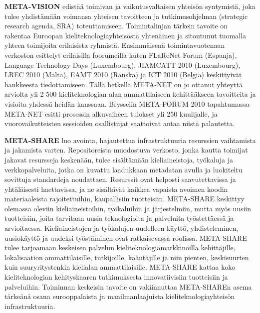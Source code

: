 \begin{multicols}{2}

\textbf{META-VISION} edistää toimivan ja vaikutusvaltaisen yhteisön
syntymistä, joka tulee yhdistämään voimansa yhteisen tavoitteen ja
tutkimusohjelman (strategic research agenda, SRA)
toteuttamiseen. Toimintalinjan tärkein tavoite on rakentaa Euroopan
kieliteknologiayhteisöstä yhtenäinen ja sitoutunut tuomalla yhteen
toimijoita erilaisista ryhmistä. Ensimmäisenä toimintavuotenaan
verkoston esittelyt erilaisilla foorumeilla kuten FLaReNet Forum
(Espanja), Language Technology Days (Luxembourg), JIAMCATT 2010
(Luxembourg), LREC 2010 (Malta), EAMT 2010 (Ranska) ja ICT 2010
(Belgia) keskittyivät hankkeesta tiedottamiseen.  Tällä hetkellä
META-NET on jo ottanut yhteyttä arviolta yli 2 500 kieliteknologian
alan ammattilaiseen kehittääkseen tavoitteita ja visioita yhdessä
heidän kanssaan. Brysselin META-FORUM 2010 tapahtumassa META-NET
esitti prosessin alkuvaiheen tulokset yli 250 kuulijalle, ja
vuorovaikutteisten sessioiden osallistujat saattoivat antaa niistä
palautetta.

\textbf{META-SHARE} luo avointa, hajautettua infrastruktuuria
resurssien vaihtamista ja jakamista varten. Repositoreista muodostuva
verkosto, jonka kautta toimijat jakavat resursseja keskenään, tulee
sisältämään kieliaineistoja, työkaluja ja verkkopalveluita, jotka on
kuvattu laadukkaan metadatan avulla ja luokiteltu sovittuja
standardeja noudattaen. Resurssit ovat helposti saavutettavissa ja
yhtäläisesti haettavissa, ja ne sisältävät kaikkea vapaista avoimen
koodin materiaaleista rajoitettuihin, kaupallisiin
tuotteisiin. META-SHARE keskittyy olemassa oleviin kieliaineistoihin,
työkaluihin ja järjestelmiin, mutta myös uusiin tuotteisiin, joita
tarvitaan uusia teknologioita ja palveluita työstettäessä ja
arvioitaessa. Kieliaineistojen ja työkalujen uudelleen käyttö,
yhdisteleminen, uusiokäyttö ja uudeksi työstäminen ovat ratkaisevassa
roolissa.  META-SHARE tulee tarjoamaan keskeisen palvelun
kieliteknologiamarkkinoilla kehittäjille, lokalisaation
ammattilaisille, tutkijoille, kääntäjille ja niin pienten,
keskisuurten kuin suuryritystenkin kielialan ammattilaisille.
META-SHARE kattaa koko kieliteknologian kehityskaaren tutkimuksesta
innovatiivisiin tuotteisiin ja palveluihin. Toiminnan keskeisin
tavoite on vakiinnuttaa META-SHAREn asema tärkeänä osana
eurooppalaista ja maailmanlaajuista kieliteknologiayhteisön
infrastruktuuria.


\end{multicols}
